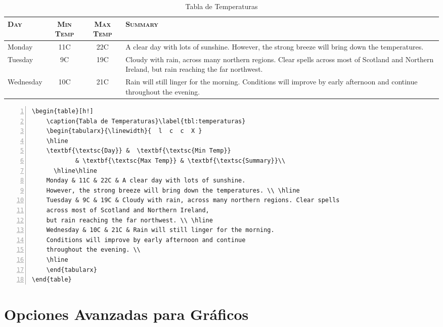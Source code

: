 \begin{table}[h!]
    \caption{Tabla de Temperaturas}\label{tbl:temperaturas}
    \begin{tabularx}{\linewidth}{  l  c  c  X }
    \hline
    \textbf{\textsc{Day}} &  \textbf{\textsc{Min Temp}} 
    		& \textbf{\textsc{Max Temp}} & \textbf{\textsc{Summary}}\\
	  \hline\hline
    Monday & 11C & 22C & A clear day with lots of sunshine.
    However, the strong breeze will bring down the temperatures. \\ \hline
    Tuesday & 9C & 19C & Cloudy with rain, across many northern regions. Clear spells
    across most of Scotland and Northern Ireland,
    but rain reaching the far northwest. \\ \hline
    Wednesday & 10C & 21C & Rain will still linger for the morning.
    Conditions will improve by early afternoon and continue
    throughout the evening. \\
    \hline
    \end{tabularx}
\end{table}

\begin{Verbatim}[frame=lines, label=\autoref{fig:logousm_float}
				, fontsize=\footnotesize, numbers=left
				, baselinestretch=1
				, formatcom=\color{gray}]
\begin{table}[h!]
    \caption{Tabla de Temperaturas}\label{tbl:temperaturas}
    \begin{tabularx}{\linewidth}{  l  c  c  X }
    \hline
    \textbf{\textsc{Day}} &  \textbf{\textsc{Min Temp}} 
    		& \textbf{\textsc{Max Temp}} & \textbf{\textsc{Summary}}\\
	  \hline\hline
    Monday & 11C & 22C & A clear day with lots of sunshine.
    However, the strong breeze will bring down the temperatures. \\ \hline
    Tuesday & 9C & 19C & Cloudy with rain, across many northern regions. Clear spells
    across most of Scotland and Northern Ireland,
    but rain reaching the far northwest. \\ \hline
    Wednesday & 10C & 21C & Rain will still linger for the morning.
    Conditions will improve by early afternoon and continue
    throughout the evening. \\
    \hline
    \end{tabularx}
\end{table}
\end{Verbatim}


\section{Opciones Avanzadas para Gráficos}

